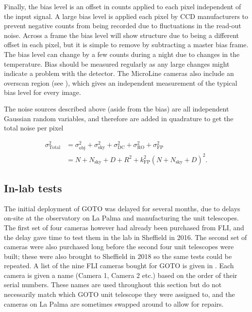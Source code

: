 \begin{colsection}
\begin{colsection}
Finally, the bias level is an offset in counts applied to each pixel independent of the input signal. A large bias level is applied each pixel by CCD manufacturers to prevent negative counts from being recorded due to fluctuations in the read-out noise. Across a frame the bias level will show structure due to being a different offset in each pixel, but it is simple to remove by subtracting a master bias frame. The bias level can change by a few counts during a night due to changes in the temperature. Bias should be measured regularly as any large changes might indicate a problem with the detector. The MicroLine cameras also include an overscan region (see ), which gives an independent measurement of the typical bias level for every image.

The noise sources described above (aside from the bias) are all independent Gaussian random variables, and therefore are added in quadrature to get the total noise per pixel

\begin{equation}
    \begin{split}
        \sigma_\text{Total}^2 & = \sigma_\text{obj}^2 +
                                  \sigma_\text{sky}^2 +
                                  \sigma_\text{DC}^2 +
                                  \sigma_\text{RO}^2 +
                                  \sigma_\text{FP}^2 \\
                              & = N + N_\text{sky} + D + R^2 + k_\text{FP}^2{(N+N_\text{sky}+D)}^2.
    \end{split}
    \label{eq:noise}
\end{equation}

\end{colsection}

\subsection{In-lab tests}
\label{sec:camera_tests}
\begin{colsection}

The initial deployment of GOTO was delayed for several months, due to delays on-site at the observatory on La Palma and manufacturing the unit telescopes. The first set of four cameras however had already been purchased from FLI, and the delay gave time to test them in the lab in Sheffield in 2016. The second set of cameras were also purchased long before the second four unit telescopes were built; these were also brought to Sheffield  in 2018 so the same tests could be repeated. A list of the nine FLI cameras bought for GOTO is given in . Each camera is given a name (Camera 1, Camera 2 etc.) based on the order of their serial numbers. These names are used throughout this section but do not necessarily match which GOTO unit telescope they were assigned to, and the cameras on La Palma are sometimes swapped around to allow for repairs.


\end{colsection}
\end{colsection}
